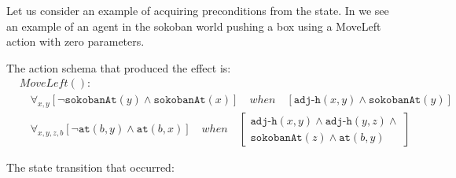 \documentclass[\master/Master.tex]{subfiles}
\begin{document}
\begin{example}\label{ex:ca:sokoban-moveleft-action}
    Let us consider an example of acquiring preconditions from the state. In  we see an example of an agent in the sokoban world pushing a box using a MoveLeft action with zero parameters.

    The action schema that produced the effect is:
    \begin{align*}
    &MoveLeft():&  \\
    &\quad
        \forall_{x, y}
            \left[
                \neg\texttt{sokobanAt}(y) \land \texttt{sokobanAt}(x)
            \right]
            \quad when \quad
            \left[ \texttt{adj-h}(x,y) \land \texttt{sokobanAt}(y) \right]& \\
    &\quad
        \forall_{x, y, z, b}
            \left[ \neg\texttt{at}(b,y) \land \texttt{at}(b,x) \right]
            \quad when \quad
            \left[
                \begin{gathered}
                     \texttt{adj-h}(x,y) \land \texttt{adj-h}(y,z) \land \\
                          \texttt{sokobanAt}(z) \land \texttt{at}(b, y)
                \end{gathered}
            \right] &
    \end{align*}

    The state transition that occurred:


\end{example}
\end{document}
